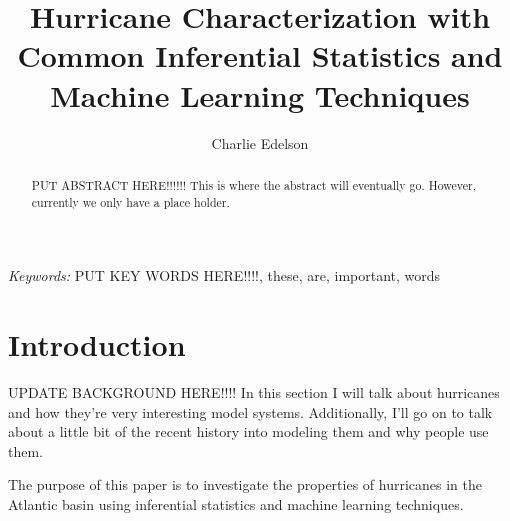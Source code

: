 \documentclass{article}
\title{Hurricane Characterization with Common Inferential Statistics and Machine Learning Techniques}
\author{Charlie Edelson}
\providecommand{\keywords}[1]{\small{\textit{Keywords:} #1}}
\begin{document}
	
	\maketitle

	\begin{abstract}
	PUT ABSTRACT HERE!!!!!! This is where the abstract will eventually go. However, currently we only have a place holder.
	\end{abstract}
	
	\keywords{PUT KEY WORDS HERE!!!!, these, are, important, words}

	\section{Introduction}
	UPDATE BACKGROUND HERE!!!! In this section I will talk about hurricanes and how they're very interesting model systems. Additionally, I'll go on to talk about a little bit of the recent history into modeling them and why people use them.
	
	The purpose of this paper is to investigate the properties of hurricanes in the Atlantic basin using inferential statistics and machine learning techniques.
	
\end{document}
